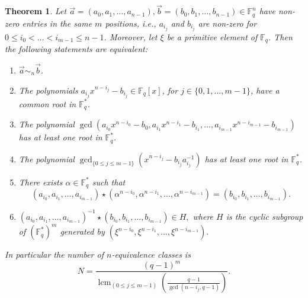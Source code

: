 \documentclass[10pt,a4paper]{amsart}
\newtheorem{theorem}{Theorem}
\newcommand{\Fq}{\mathbb{F}_{q}}
\DeclareMathOperator{\lcm}{lcm}
\begin{document}
\begin{theorem}\label{Th_general}
Let $ \vec{a}=(a_0,a_1,\ldots, a_{n-1}), \vec{b}=(b_0,b_1,\ldots, b_{n-1})\in \mathbb{F}_q^{n}$ have non-zero entries in the same $m$ positions, i.e., $a_{i_j}$ and $b_{i_j}$ are non-zero  for $0\leq i_0<\dots<i_{m-1}\leq n-1$. Moreover, let $\xi $ be a primitive element of $\Fq$. Then the following statements are equivalent:
\begin{enumerate}
\item $ \vec{a} \sim_{n} \vec{b}$. 

\item The polynomials $ a_{i_j} x^{n-i_j} - b_{i_j} \in \mathbb{F}_q[x]$, for $ j \in \{0,1,\ldots,m-1\}$, have a common root in $\mathbb{F}_q^*$.

\item The polynomial $ \gcd( a_{i_0} x^{n-i_0} - b_0, a_{i_1} x^{n-i_1} - b_{i_1}, \ldots, a_{i_{m-1}} x^{n-i_{m-1}} - b_{i_{m-1}})$ has at least one root in $\mathbb{F}_q^*$.

\item The polynomial $ \gcd_{\{0 \leq j \leq m-1\}}( x^{n-{i_j}} - b_{i_j} a_{i_j}^{-1}) $ has at least one root in $\mathbb{F}_q^*$.
 \item  There exists $\alpha\in \Fq^*$ such that $$ (a_{i_0}, a_{i_1},\ldots, a_{i_{m-1}})\star(\alpha^{n-{i_0}}, \alpha^{n-{i_1}} , \ldots, \alpha^{n-{i_{m-1}}})=  ( b_{i_0}, b_{i_1},\ldots, b_{i_{m-1}}).$$
\item $ (a_{i_0}, a_{i_1},\ldots, a_{i_{m-1}})^{-1}\star( b_{i_0}, b_{i_1},\ldots, b_{i_{m-1}}) \in H,$ where $H$ is the cyclic subgroup of $ (\Fq^*)^m$ generated by 
$( \xi^{n-{i_0}},\xi^{n-{i_1}},\ldots, \xi^{n-{i_{m-1}}} ).$
\end{enumerate}
In particular the number of $n$-equivalence classes is
$$ N=\dfrac{ (q-1)^m}{ \lcm_{ (0 \leq j\leq m-1)}\left(\frac{q-1}{ \gcd(n-i_j,q-1)}\right)}. $$ 
\end{theorem}
\end{document}
